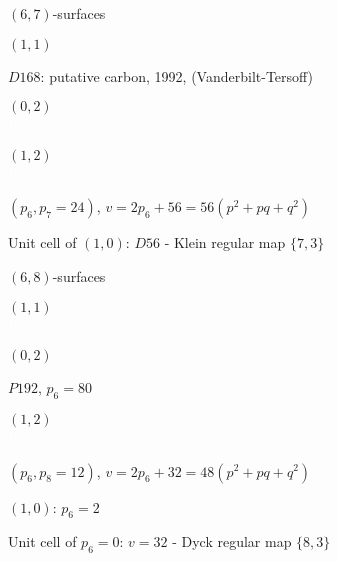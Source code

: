 \documentclass[%
pdf,
colorBG,
slideColor,
]{prosper}
\begin{document}
\begin{slide}{$(6,7)$-surfaces}
\begin{center}
\begin{minipage}[b]{3.7cm}
\centering
{}\par
$(1,1)$\par
$D168$: putative carbon, 1992, (Vanderbilt-Tersoff)
\end{minipage}
\begin{minipage}[b]{3.7cm}
\centering
{}\par
$(0,2)$\\
\textcolor{white}{Bonjour}
\end{minipage}
\begin{minipage}[b]{3.7cm}
\centering
{}\par
$(1,2)$\\
\textcolor{white}{Bonjour}
\end{minipage}
\end{center}

\begin{center}
$(p_6, p_7=24)$, $v=2p_6+56=56(p^2+pq+q^2)$\par
Unit cell of $(1,0)$: $D56$ - Klein regular map $\{7,3\}$

\end{center}
\end{slide}




\begin{slide}{$(6,8)$-surfaces}
\begin{center}
\begin{minipage}[b]{3.7cm}
\centering
{}\par
$(1,1)$\\
\textcolor{white}{Bonjour}
\end{minipage}
\begin{minipage}[b]{3.7cm}
\centering
{}\par
$(0,2)$\par
$P192$, $p_6=80$
\end{minipage}
\begin{minipage}[b]{3.7cm}
\centering
{}\par
$(1,2)$\\
\textcolor{white}{Bonjour}
\end{minipage}
\end{center}

\begin{center}
$(p_6, p_8=12)$, $v=2p_6+32=48(p^2+pq+q^2)$\par
$(1,0)$: $p_6=2$ \par
Unit cell of $p_6=0$: $v=32$ - Dyck regular map $\{8,3\}$
\end{center}
\end{slide}
\end{document}

